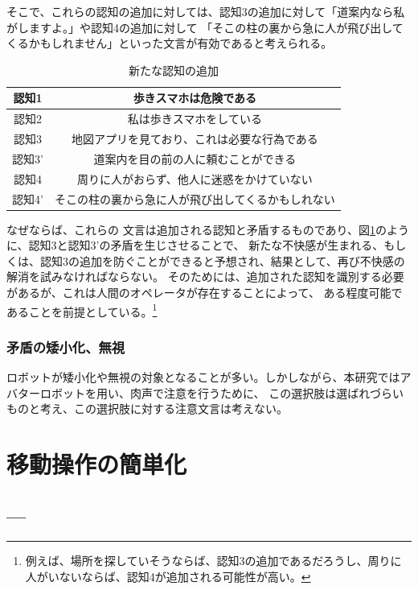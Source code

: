 \documentclass[11pt,a4j]{jreport}
\begin{document}
そこで、これらの認知の追加に対しては、認知3の追加に対して「道案内なら私がしますよ。」や認知4の追加に対して
「そこの柱の裏から急に人が飛び出してくるかもしれません」といった文言が有効であると考えられる。
\begin{table}[h]
  \centering
  \caption{新たな認知の追加}
  \label{fig: AvoidDissonanceBlock}
  \begin{tabular}{c|c}
      認知1 & 歩きスマホは危険である \\ \hline
      認知2 & 私は歩きスマホをしている \\ \hline
      認知3 & 地図アプリを見ており、これは必要な行為である \\
      認知3' & 道案内を目の前の人に頼むことができる \\ \hline
      認知4 & 周りに人がおらず、他人に迷惑をかけていない \\ 
      認知4' & そこの柱の裏から急に人が飛び出してくるかもしれない \\ \hline
  \end{tabular}
\end{table}
なぜならば、これらの
文言は追加される認知と矛盾するものであり、図\ref{fig: AvoidDissonanceBlock}のように、認知3と認知3'の矛盾を生じさせることで、
新たな不快感が生まれる、もしくは、認知3の追加を防ぐことができると予想され、結果として、再び不快感の解消を試みなければならない。
そのためには、追加された認知を識別する必要があるが、これは人間のオペレータが存在することによって、
ある程度可能であることを前提としている。\footnote[1]{例えば、場所を探していそうならば、認知3の追加であるだろうし、周りに人がいないならば、認知4が追加される可能性が高い。}

\subsubsection{矛盾の矮小化、無視}
ロボットが矮小化や無視の対象となることが多い\cite{Schneider2022}。しかしながら、本研究ではアバターロボットを用い、肉声で注意を行うために、
この選択肢は選ばれづらいものと考え、この選択肢に対する注意文言は考えない。

\subsection{}
\section{移動操作の簡単化}
\subsection{---}
\end{document}
